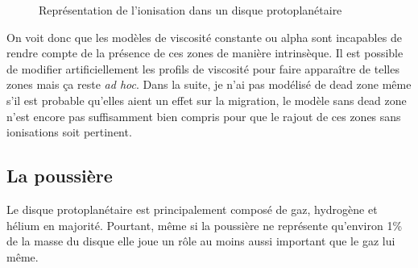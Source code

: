\begin{figure}[htbp]
\centering
{}\hfill
{}
\caption{Représentation de l'ionisation dans un disque protoplanétaire}
\end{figure}

On voit donc que les modèles de viscosité constante ou alpha sont incapables de rendre compte de la présence de ces zones de manière intrinsèque. Il est possible de modifier artificiellement les profils de viscosité pour faire apparaître de telles zones mais ça reste \textit{ad hoc}. Dans la suite, je n'ai pas modélisé de dead zone même s'il est probable qu'elles aient un effet sur la migration, le modèle sans dead zone n'est encore pas suffisamment bien compris pour que le rajout de ces zones sans ionisations soit pertinent.

\subsection{La poussière}
Le disque protoplanétaire est principalement composé de gaz, hydrogène et hélium en majorité. Pourtant, même si la poussière ne représente qu'environ 1\% de la masse du disque elle joue un rôle au moins aussi important que le gaz lui même.


